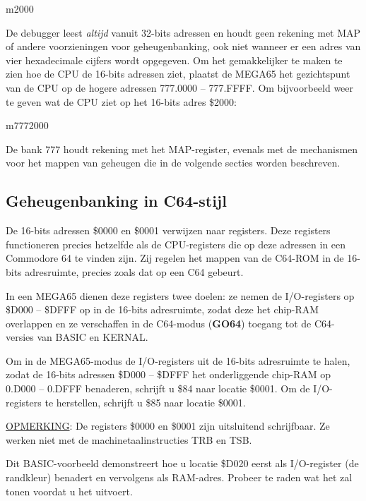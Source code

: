 \begin{basiccode}
m2000
\end{basiccode}

De debugger leest {\em altijd} vanuit 32-bits adressen en houdt geen rekening met MAP of andere voorzieningen voor geheugenbanking, ook niet wanneer er een adres van vier hexadecimale cijfers wordt opgegeven. Om het gemakkelijker te maken te zien hoe de CPU de 16-bits adressen ziet, plaatst de MEGA65 het gezichtspunt van de CPU op de hogere adressen 777.0000 -- 777.FFFF. Om bijvoorbeeld weer te geven wat de CPU ziet op het 16-bits adres \$2000:

\begin{basiccode}
m7772000
\end{basiccode}

De bank 777 houdt rekening met het MAP-register, evenals met de mechanismen voor het mappen van geheugen die in de volgende secties worden beschreven.

\subsection{Geheugenbanking in C64-stijl}

De 16-bits adressen \$0000 en \$0001 verwijzen naar registers. Deze registers functioneren precies hetzelfde als de CPU-registers die op deze adressen in een Commodore 64 te vinden zijn. Zij regelen het mappen van de C64-ROM in de 16-bits adresruimte, precies zoals dat op een C64 gebeurt.

In een MEGA65 dienen deze registers twee doelen: ze nemen de I/O-registers op \$D000 -- \$DFFF op in de 16-bits adresruimte, zodat deze het chip-RAM overlappen en ze verschaffen in de C64-modus (\textbf{GO64}) toegang tot de C64-versies van BASIC en KERNAL.

Om in de MEGA65-modus de I/O-registers uit de 16-bits adresruimte te halen, zodat de 16-bits adressen \$D000 -- \$DFFF het onderliggende chip-RAM op 0.D000 -- 0.DFFF benaderen, schrijft u \$84 naar locatie \$0001. Om de I/O-registers te herstellen, schrijft u \$85 naar locatie \$0001.

\underline{OPMERKING}: De registers \$0000 en \$0001 zijn uitsluitend schrijfbaar. Ze werken niet met de machinetaalinstructies TRB en TSB.

Dit BASIC-voorbeeld demonstreert hoe u locatie \$D020 eerst als I/O-register (de randkleur) benadert en vervolgens als RAM-adres. Probeer te raden wat het zal tonen voordat u het uitvoert.

